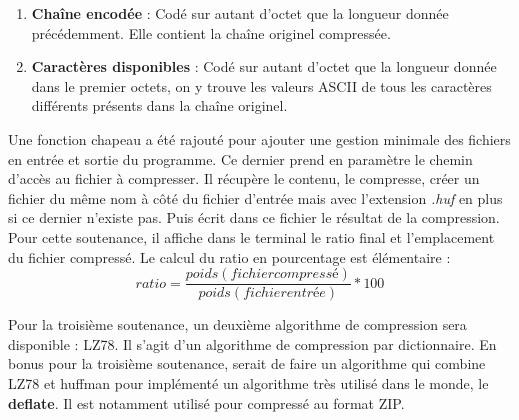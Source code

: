 \begin{itemize}
\begin{enumerate}
                    \item \textbf{Chaîne encodée} : Codé sur autant d'octet que la longueur donnée précédemment. Elle contient la chaîne originel compressée.
                    \item \textbf{Caractères disponibles} : Codé sur autant d'octet que la longueur donnée dans le premier octets, on y trouve les valeurs ASCII de tous les caractères différents présents dans la chaîne originel.
                \end{enumerate}
        \end{itemize}
        
        Une fonction chapeau a été rajouté pour ajouter une gestion minimale des fichiers en entrée et sortie du programme. Ce dernier prend en paramètre le chemin d'accès au fichier à compresser. Il récupère le contenu, le compresse, créer un fichier du même nom à côté du fichier d'entrée mais avec l'extension \textit{.huf} en plus si ce dernier n'existe pas. Puis écrit dans ce fichier le résultat de la compression. Pour cette soutenance, il affiche dans le terminal le ratio final et l'emplacement du fichier compressé.
        Le calcul du ratio en pourcentage est élémentaire :
        \[
            ratio = \frac{poids(fichier compressé)}{poids(fichier entrée)} * 100
        \]
        
        Pour la troisième soutenance, un deuxième algorithme de compression sera disponible : LZ78. Il s'agit d'un algorithme de compression par dictionnaire.
        En bonus pour la troisième soutenance, serait de faire un algorithme qui combine LZ78 et huffman pour implémenté un algorithme très utilisé dans le monde, le \textbf{deflate}. Il est notamment utilisé pour compressé au format ZIP.
